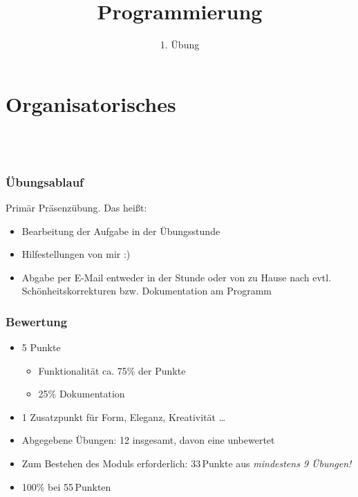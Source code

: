 
\title{Programmierung}
\subtitle{1. Übung}

\newcommand{\s}{\textvisiblespace}
\newcommand{\bs}{\s\s\s\s}


    \begin{frame}
        \frontframe
    \end{frame}

    \section{Organisatorisches}
    \subsection{~}

    \begin{frame}
        \frametitle{Übungsablauf}
        Primär Präsenzübung. Das heißt:
        \begin{itemize}
        \item Bearbeitung der Aufgabe in der Übungsstunde
        \item Hilfestellungen von mir :)
        \item Abgabe per E-Mail entweder in der Stunde oder von zu Hause nach
            evtl. Schönheitskorrekturen bzw. Dokumentation am Programm
        \end{itemize}
    \end{frame}

    \begin{frame}
        \frametitle{Bewertung}
        \begin{itemize}
        \item 5 Punkte
            \pause
            \begin{itemize}
            \item Funktionalität ca. 75\% der Punkte
            \item 25\% Dokumentation
            \end{itemize}
        \pause
        \item 1 Zusatzpunkt für Form, Eleganz, Kreativität …
        \pause
        \item Abgegebene Übungen: 12 insgesamt, davon eine unbewertet
        \item Zum Bestehen des Moduls erforderlich: 33\,Punkte aus \emph{mindestens
            9 Übungen!}
        \item 100\% bei 55\,Punkten
        \end{itemize}
    \end{frame}

